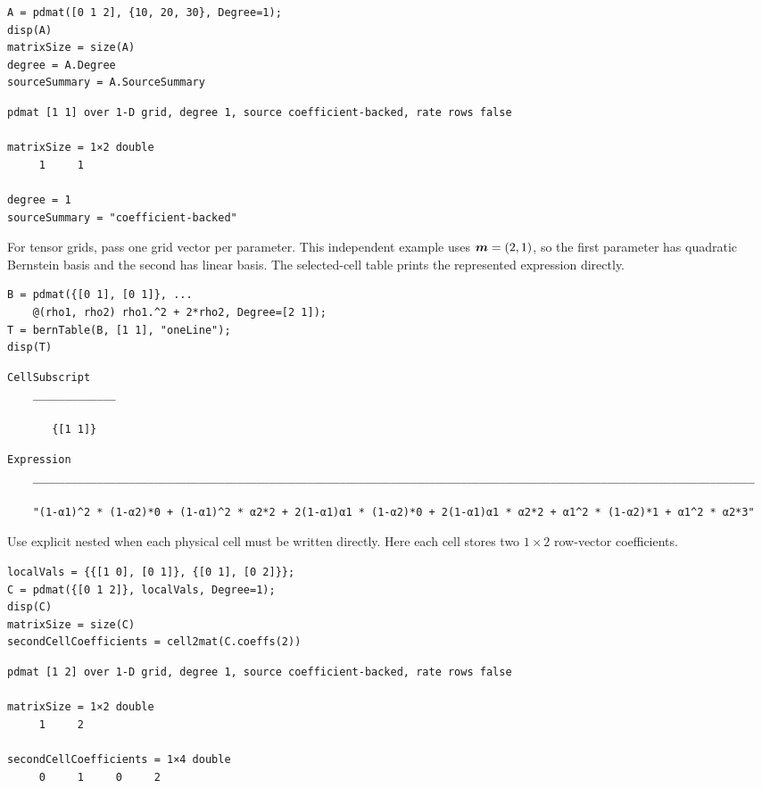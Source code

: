 \begin{lstlisting}[style=dpmatlab]
A = pdmat([0 1 2], {10, 20, 30}, Degree=1);
disp(A)
matrixSize = size(A)
degree = A.Degree
sourceSummary = A.SourceSummary
\end{lstlisting}

\begin{lstlisting}[style=dpoutput]
pdmat [1 1] over 1-D grid, degree 1, source coefficient-backed, rate rows false

matrixSize = 1×2 double
     1     1

degree = 1
sourceSummary = "coefficient-backed"
\end{lstlisting}

For tensor grids, pass one grid vector per parameter. This independent example uses $\boldsymbol{m}=(2,1)$, so the first parameter has quadratic Bernstein basis and the second has linear basis. The selected-cell  table prints the represented expression directly.

\begin{lstlisting}[style=dpmatlab]
B = pdmat({[0 1], [0 1]}, ...
    @(rho1, rho2) rho1.^2 + 2*rho2, Degree=[2 1]);
T = bernTable(B, [1 1], "oneLine");
disp(T)
\end{lstlisting}

\begin{lstlisting}[style=dpoutput]
    CellSubscript
    _____________

       {[1 1]}
\end{lstlisting}
\begin{lstlisting}[style=dpwideoutput]
    Expression
    _________________________________________________________________________________________________________________

    "(1-α1)^2 * (1-α2)*0 + (1-α1)^2 * α2*2 + 2(1-α1)α1 * (1-α2)*0 + 2(1-α1)α1 * α2*2 + α1^2 * (1-α2)*1 + α1^2 * α2*3"
\end{lstlisting}

Use explicit nested  when each physical cell must be written directly.  Here each cell stores two $1\times2$ row-vector coefficients.

\begin{lstlisting}[style=dpmatlab]
localVals = {{[1 0], [0 1]}, {[0 1], [0 2]}};
C = pdmat({[0 1 2]}, localVals, Degree=1);
disp(C)
matrixSize = size(C)
secondCellCoefficients = cell2mat(C.coeffs(2))
\end{lstlisting}

\begin{lstlisting}[style=dpoutput]
pdmat [1 2] over 1-D grid, degree 1, source coefficient-backed, rate rows false

matrixSize = 1×2 double
     1     2

secondCellCoefficients = 1×4 double
     0     1     0     2
\end{lstlisting}

